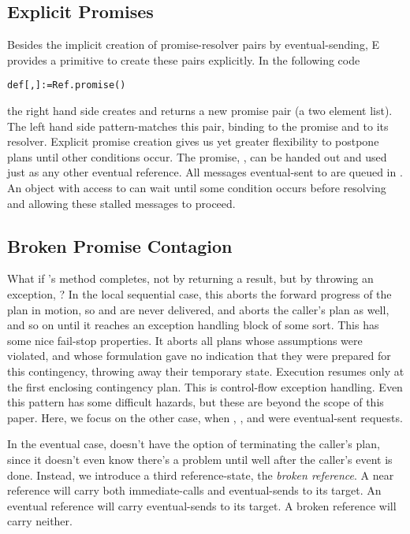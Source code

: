 \documentclass{llncs}
\begin{document}
\subsection{Explicit Promises}

Besides the implicit creation of promise-resolver pairs by
eventual-sending, E provides a primitive to create these pairs
explicitly. In the following code
%
\begin{alltt}
    def [, ] := Ref.promise()
\end{alltt}
%
the right hand side creates and returns a new promise pair (a two
element list). The left hand side pattern-matches this pair, binding
 to the promise and  to its resolver. Explicit promise
creation gives us yet greater flexibility to postpone plans until
other conditions occur. The promise, , can be handed out and
used just as any other eventual reference. All messages eventual-sent
to  are queued in . An object with access to  can
wait until some condition occurs before resolving  and allowing
these stalled messages to proceed.

\subsection{Broken Promise Contagion}

What if 's  method completes, not by
returning a result, but by throwing an exception, ? In the
local sequential case, this aborts the forward progress of the plan in
motion, so  and  are never delivered, and aborts
the caller's plan as well, and so on until it reaches an exception
handling block of some sort. This has some nice fail-stop
properties. It aborts all plans whose assumptions were violated, and
whose formulation gave no indication that they were prepared for this
contingency, throwing away their temporary state. Execution resumes
only at the first enclosing contingency plan. This is control-flow
exception handling. Even this pattern has some difficult hazards, but
these are beyond the scope of this paper. Here, we focus on the other
case, when , , and  were eventual-sent
requests.

In the eventual case,  doesn't have the option of terminating the
caller's plan, since it doesn't even know there's a problem until well
after the caller's event is done. Instead, we introduce a third
reference-state, the \emph{broken reference}. A near reference will
carry both immediate-calls and eventual-sends to its target. An
eventual reference will carry eventual-sends to its target. A broken
reference will carry neither.
\end{document}
